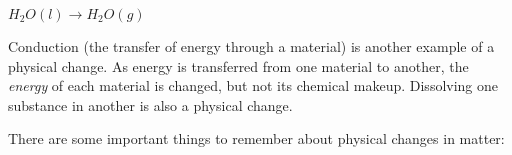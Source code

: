 \begin{center}
\rm${H_{2}O(l) \rightarrow H_{2}O(g)}$
\end{center}

Conduction (the transfer of energy through a material) is another example of a physical change. As energy is transferred from one material to another, the \textit{energy} of each material is changed, but not its chemical makeup. Dissolving one substance in another is also a physical change.


There are some important things to remember about physical changes in matter:

